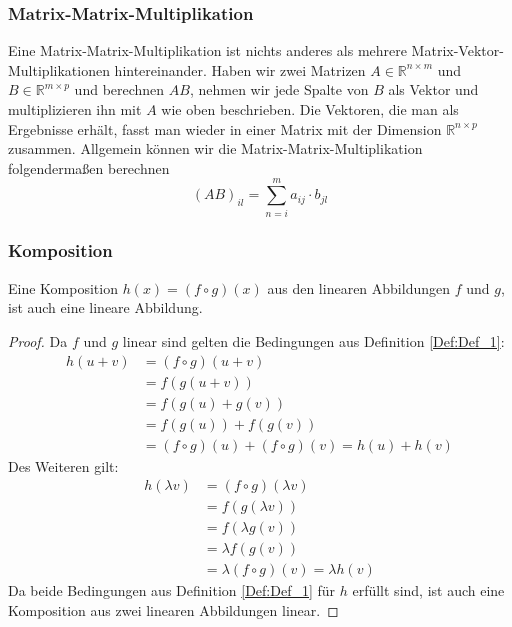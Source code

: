 \subsubsection{Matrix-Matrix-Multiplikation}
Eine Matrix-Matrix-Multiplikation ist nichts anderes als mehrere Matrix-Vektor-Multiplikationen hintereinander. Haben wir zwei Matrizen $A \in \mathbb{R}^{n \times m}$ und $B \in \mathbb{R}^{m \times p}$ und berechnen $AB$, nehmen wir jede Spalte von $B$ als Vektor und multiplizieren ihn mit $A$ wie oben beschrieben. Die Vektoren, die man als Ergebnisse erhält, fasst man wieder in einer Matrix mit der Dimension $\mathbb{R}^{n \times p}$ zusammen. Allgemein können wir die Matrix-Matrix-Multiplikation folgendermaßen berechnen
\begin{equation*}
	(AB)_{il} = \sum_{n=i}^{m}a_{ij} \cdot b_{jl}
\end{equation*}

\subsubsection{Komposition}
\begin{Thm}
Eine Komposition $h(x) = (f \circ g)(x)$ aus den linearen Abbildungen $f$ und $g$, ist auch eine lineare Abbildung.
\end{Thm}

\begin{proof}
Da $f$ und $g$ linear sind gelten die Bedingungen aus Definition \ref{Def:Def_1}:
\begin{align*}
	h(u+v) &= (f \circ g)(u+v)\\
	&= f(g(u+v))\\
	&= f(g(u)+g(v))\\
	&= f(g(u)) + f(g(v))\\
	&= (f\circ g)(u) + (f\circ g)(v) = h(u) + h(v)
\end{align*}
Des Weiteren gilt:
\begin{align*}
	h(\lambda v) &= (f \circ g)(\lambda v)\\
	&=f(g(\lambda v))\\
	&= f(\lambda g(v))\\
	&=\lambda f(g(v))\\
	&=\lambda (f \circ g)(v) = \lambda h(v)
\end{align*}
Da beide Bedingungen aus Definition \ref{Def:Def_1} für $h$ erfüllt sind, ist auch eine Komposition aus zwei linearen Abbildungen linear.
\end{proof}

